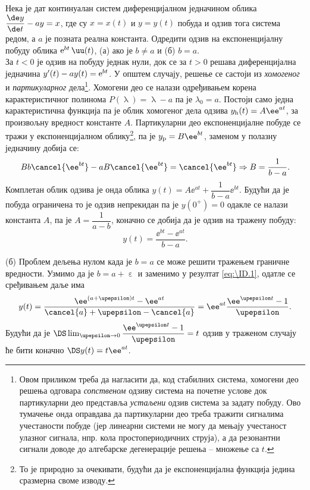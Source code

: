 \PID\mnImportant
Нека је дат континуалан систем диференцијалном једначином облика 
${\dfrac{\de y}{\de t} - ay = x}$, где су $x=x(t)$ и $y=y(t)$ побуда и одзив тога система редом, а $a$ је позната
реална константа. Одредити одзив на експоненцијалну побуду облика 
${\rm e}^{bt} \, \uu(t)$, (а) ако је $b \neq a$ и (б) $b = a$. \\[5mm]

\RESENJE  За $t < 0$ је одзив на побуду једнак нули, док се 
за $t > 0$ решава диференцијална једначина 
${y'(t) - ay(t)  = {\rm e}^{bt}}$. У општем случају, решење се састоји из 
\textit{хомогеног} и \textit{партикуларног} дела\footnote{Овом приликом треба да нагласити 
да, код стабилних система, хомогени део решења одговара \textit{сопственом} одзиву система на почетне услове
док партикуларни део представља \textit{устаљени} одзив система за задату побуду. Ово тумачење онда оправдава
да партикуларни део треба тражити сигналима учестаности побуде (јер линеарни системи не могу да мењају учестаност 
улазног сигнала, нпр. кола простопериодичних струја), а да резонантни сигнали доводе 
до алгебарске дегенерације решења -- множење са $t$.}. Хомогени део се налази одређивањем корена 
карактеристичног полинома $P(\uplambda) = \uplambda - a$ па је $\lambda_0 = a$. Постоји само 
једна карактеристична функција па је облик хомогеног дела одзива 
$y_{\rm h}(t) = A \ee^{at}$, за произвољну вредност константе $A$. Партикуларни део експоненцијалне побуде се тражи у 
експоненцијалном облику\footnote{То је природно за очекивати, будући да је експоненцијална функција
једина сразмерна своме изводу.}, па је $y_{\rm p} = B\ee^{bt}$, заменом у полазну једначину добија се:
\begin{equation}
    Bb\cancel{\ee^{bt}} - aB\cancel{\ee^{bt}} = \cancel{\ee^{bt}} \Rightarrow
    B = \dfrac{1}{b - a}.
\end{equation}
Комплетан облик одзива је онда облика $y(t) = A\ee^{at} + \dfrac{1}{b-a} \ee^{bt}$. Будући да је
побуда ограничена то је одзив непрекидан па је $y(0^+) = 0$ одакле се налази константа $A$, 
па је $A = \dfrac{1}{a - b}$, коначно се добија да је одзив на тражену побуду:
\begin{equation}
    y(t) = \dfrac{\ee^{bt} - \ee^{at}}{b - a}.
    \label{eq:\ID.1}
\end{equation}

(б) 
Проблем дељења нулом када је $b=a$ се може решити тражењем граничне вредности. 
Узмимо да је $b = a + \upepsilon$ 
и заменимо у резултат \ref{eq:\ID.1}, одатле се сређивањем даље има
\begin{equation}
    y(t) = \dfrac{\ee^{(a + \upepsilon)t} - \ee^{at}}{\cancel{a} + \upepsilon - \cancel{a}} = 
    \ee^{at} \dfrac{\ee^{\upepsilon t} - 1}{\upepsilon}.
\end{equation}
Будући да је $\DS \lim_{\upepsilon\to 0} \dfrac{\ee^{\upepsilon t} - 1}{\upepsilon} = t$ одзив
у траженом случају ће бити коначно 
$\DS y(t) = t \ee^{at}$.

